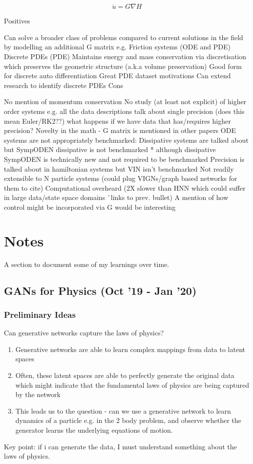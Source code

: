 \documentclass{article}
\begin{document}
$$ \dot{u} = G\nabla H $$
 

Positives

Can solve a broader class of problems compared to current solutions in the field by modelling an additional G matrix e.g.
Friction systems (ODE and PDE)
Discrete PDEs (PDE)
Maintains energy and mass conservation via discretisation which preserves the geometric structure (a.k.a volume preservation)
Good form for discrete auto differentiation
Great PDE dataset motivations
Can extend research to identify discrete PDEs
Cons

No mention of momentum conservation
No study (at least not explicit) of higher order systems e.g. all the data descriptions talk about single precision (does this mean Euler/RK2??) what happens if we have data that has/requires higher precision?
Novelty in the math - G matrix is mentioned in other papers
ODE systems are not appropriately benchmarked:
Dissipative systems are talked about but SympODEN dissipative is not benchmarked * although dissipative SympODEN is technically new and not required to be benchmarked
Precision is talked about in hamiltonian systems but VIN isn’t benchmarked
Not readily extensible to N particle systems (could plug VIGNs/graph based networks for them to cite)
Computational overheard (2X slower than HNN which could suffer in large data/state space domains ^^ links to prev. bullet)
A mention of how control might be incorporated via G would be interesting

\section{Notes}

A section to document some of my learnings over time.

\subsection{GANs for Physics (Oct '19 - Jan '20)}

\subsubsection*{Preliminary Ideas}

Can generative networks capture the laws of physics?

\begin{enumerate}
\item Generative networks are able to learn complex mappings from data to latent spaces
\item Often, these latent spaces are able to perfectly generate the original data which might indicate that the fundamental laws of physics are being captured by the network
\item This leads us to the question - can we use a generative network to learn dynamics of a particle e.g. in the 2 body problem, and observe whether the generator learns the underlying equations of motion.
\end{enumerate}
Key point: if i can generate the data, I must understand something about the laws of physics.
\end{document}
